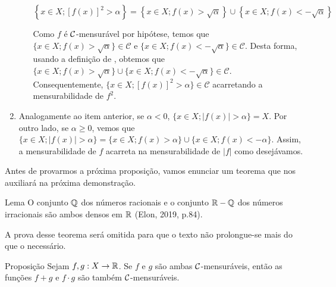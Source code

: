 \begin{prova}
\begin{enumerate}[label*=(\alph*)]
\begin{enumerate}[label = (\roman*)]
                $$\left\{x \in X; [f(x)]^2 > \alpha\right\} = \left\{x \in X; f(x)> \sqrt{\alpha}\right\}\cup \left\{x \in X; f(x)< -\sqrt{\alpha}\right\}$$
                
                Como $f$ é $\operatorname{\mathcal{C}}$-mensurável por hipótese, temos que $\{x \in X; f(x)> \sqrt{\alpha}\} \in \mathcal{C}$ e \linebreak $\{x \in X; f(x)< -\sqrt{\alpha}\} \in \mathcal{C}$.
                Desta forma, usando a definição de \sigal, obtemos que  $\{x \in X; f(x)> \sqrt{\alpha}\} \cup \{x \in X; f(x)< -\sqrt{\alpha}\} \in \mathcal{C}$. Consequentemente, 
                $\{x \in X; [f(x)]^2 > \alpha\} \in \mathcal{C}$ acarretando a mensurabilidade de $f^2$.
            \end{enumerate}
            
        \item Analogamente ao item anterior, se $\alpha < 0$, $\{x \in X; |f(x)| > \alpha\} = X$.
        Por outro lado, se $\alpha \geq 0$, vemos que 
        $\{x \in X; |f(x)| > \alpha\}=\{x \in X; f(x)> \alpha\} \cup \{x \in X; f(x)< -\alpha\}$.
        Assim, a mensurabilidade de $f$ acarreta na mensurabilidade de $|f|$ como desejávamos.
    \end{enumerate}
\end{prova}

Antes de provarmos a próxima proposição, vamos enunciar um teorema que nos auxiliará na próxima demonstração. 
\begin{resultado}{Lema}
	\label{lem:densidade de Q em R}
	O conjunto $\operatorname{\mathbb{Q}}$ dos números racionais e o conjunto
	$\mathbb{R} - \operatorname{\mathbb{Q}}$ dos números irracionais são ambos densos em $\mathbb{R}$ (Elon, 2019, p.84).
\end{resultado}

A prova desse teorema será omitida para que o texto não prolongue-se mais do que o necessário.

\begin{resultado}{Proposição}
\label{prop:aritmetica-duas-funcoes}
    Sejam $f,g:X \to \mathbb{R}$. Se $f$ e $g$ são ambas $\operatorname{\mathcal{C}}$-mensuráveis, então as funções $f+g$ e $f\cdot g$ são também $\operatorname{\mathcal{C}}$-mensuráveis.
\end{resultado}

